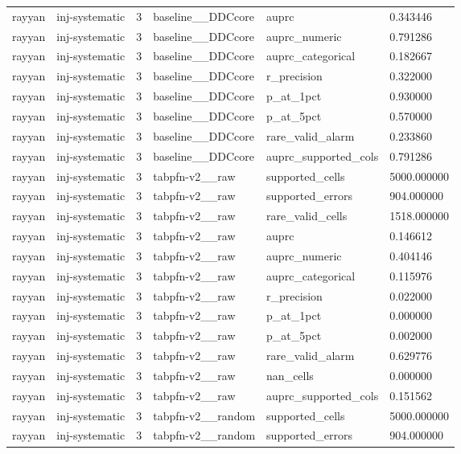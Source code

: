 \begin{tabular}{llllll}
rayyan & inj-systematic & 3 & baseline\_\_DDCcore & auprc & 0.343446 \\
rayyan & inj-systematic & 3 & baseline\_\_DDCcore & auprc\_numeric & 0.791286 \\
rayyan & inj-systematic & 3 & baseline\_\_DDCcore & auprc\_categorical & 0.182667 \\
rayyan & inj-systematic & 3 & baseline\_\_DDCcore & r\_precision & 0.322000 \\
rayyan & inj-systematic & 3 & baseline\_\_DDCcore & p\_at\_1pct & 0.930000 \\
rayyan & inj-systematic & 3 & baseline\_\_DDCcore & p\_at\_5pct & 0.570000 \\
rayyan & inj-systematic & 3 & baseline\_\_DDCcore & rare\_valid\_alarm & 0.233860 \\
rayyan & inj-systematic & 3 & baseline\_\_DDCcore & auprc\_supported\_cols & 0.791286 \\
rayyan & inj-systematic & 3 & tabpfn-v2\_\_raw & supported\_cells & 5000.000000 \\
rayyan & inj-systematic & 3 & tabpfn-v2\_\_raw & supported\_errors & 904.000000 \\
rayyan & inj-systematic & 3 & tabpfn-v2\_\_raw & rare\_valid\_cells & 1518.000000 \\
rayyan & inj-systematic & 3 & tabpfn-v2\_\_raw & auprc & 0.146612 \\
rayyan & inj-systematic & 3 & tabpfn-v2\_\_raw & auprc\_numeric & 0.404146 \\
rayyan & inj-systematic & 3 & tabpfn-v2\_\_raw & auprc\_categorical & 0.115976 \\
rayyan & inj-systematic & 3 & tabpfn-v2\_\_raw & r\_precision & 0.022000 \\
rayyan & inj-systematic & 3 & tabpfn-v2\_\_raw & p\_at\_1pct & 0.000000 \\
rayyan & inj-systematic & 3 & tabpfn-v2\_\_raw & p\_at\_5pct & 0.002000 \\
rayyan & inj-systematic & 3 & tabpfn-v2\_\_raw & rare\_valid\_alarm & 0.629776 \\
rayyan & inj-systematic & 3 & tabpfn-v2\_\_raw & nan\_cells & 0.000000 \\
rayyan & inj-systematic & 3 & tabpfn-v2\_\_raw & auprc\_supported\_cols & 0.151562 \\
rayyan & inj-systematic & 3 & tabpfn-v2\_\_random & supported\_cells & 5000.000000 \\
rayyan & inj-systematic & 3 & tabpfn-v2\_\_random & supported\_errors & 904.000000 \\

\end{tabular}
